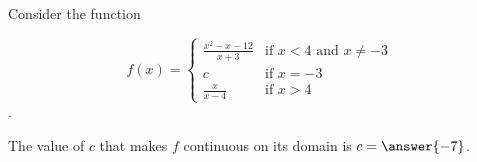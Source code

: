 \documentclass{ximera}
\author{Nela Lakos \and Kyle Parsons}
\begin{document}
\begin{exercise}

Consider the function

\[
f(x) = 
\begin{cases}
\frac{x^2-x-12}{x+3} & \text{if }x<4\text{ and }x\neq-3\\
c & \text{if }x=-3\\
\frac{x}{x-4} & \text{if }x>4
\end{cases}
\].

The value of $c$ that makes $f$ continuous on its domain is $c=\answer{-7}$.

\end{exercise}
\end{document}
